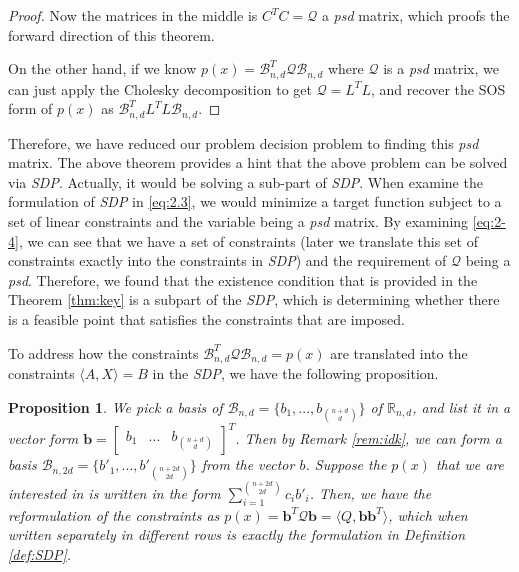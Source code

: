 \documentclass[12pt]{amsart}
\numberwithin{equation}{section}
\newtheorem{prop}[thm]{Proposition}
\theoremstyle{definition}
\numberwithin{thm}{section}
\begin{document}
\begin{proof}
     Now the matrices in the middle is $C^T C = \mathcal{Q}$ a \emph{psd} matrix, which proofs the forward direction of this theorem.

     On the other hand, if we know $p(x) = \mathcal{B}_{n, d}^T \mathcal{Q} \mathcal{B}_{n, d}$ where $\mathcal{Q}$ is a \emph{psd} matrix, 
     we can just apply the Cholesky decomposition to get $\mathcal{Q} = L^T L$, and recover the SOS form of $p(x)$ as
     $\mathcal{B}_{n, d}^T L^T L \mathcal{B}_{n, d}$. 
\end{proof}

\smallskip
Therefore, we have reduced our problem decision problem to finding this \emph{psd} matrix. 
The above theorem provides a hint that the above problem can be solved via \emph{SDP}. Actually, it would be solving a sub-part of \emph{SDP}.
When examine the formulation of \emph{SDP} in \eqref{eq:2.3}, we would minimize a target function subject to a set of linear constraints and the variable being a \emph{psd} matrix. 
By examining \eqref{eq:2-4}, we can see that we have a set of constraints (later we translate this set of constraints exactly into the constraints in \emph{SDP}) 
and the requirement of $\mathcal{Q}$ being a \emph{psd}.
Therefore, we found that the existence condition that is provided in the Theorem \ref{thm:key} is a subpart of the \emph{SDP}, 
which is determining whether there is a feasible point that satisfies the constraints that are imposed. 

To address how the constraints $\mathcal{B}_{n, d} ^ T \mathcal{Q} \mathcal{B}_{n, d} = p(x)$ are translated into the constraints $\langle A, X \rangle = B$ in the \emph{SDP}, we have the following proposition.

\begin{prop}
     \label{prop:2.19}
     We pick a basis of $\mathcal{B}_{n, d} = \{b_1, ..., b_{n + d \choose d}\}$ of $\mathbb{R}_{n, d}$, and list it in a vector form $ \mathbf{b} =\begin{bmatrix}
          b_1 &
          ... &
          b_{ n+ d \choose d}
     \end{bmatrix} ^ T$. Then by Remark \ref{rem:idk}, we can form a basis $\mathcal{B}_{n, 2d} = \{b'_1, ..., b'_{n + 2d \choose 2d}\}$ from the vector $b$. 
     Suppose the $p(x)$ that we are interested in is written in the form $\sum_{i = 1}^{n + 2d \choose 2d } c_i b'_i$.
     Then, we have the reformulation of the constraints as $p(x) = \mathbf{b}^T \mathcal{Q} \mathbf{b} = \langle Q, \mathbf{bb}^T \rangle$, 
     which when written separately in different rows is exactly the formulation in Definition \ref{def:SDP}.
\end{prop}
\end{document}

